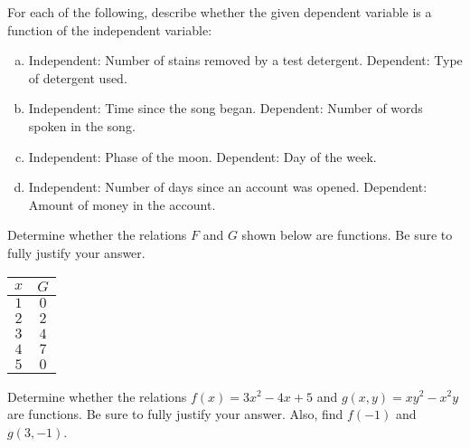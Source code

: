 \documentclass[11pt,letterpaper]{article}
\begin{document}

 For each of the following, describe whether the given dependent variable is a function of the independent variable:
	\begin{enumerate}[(a)]
	\item Independent: Number of stains removed by a test detergent. 
		Dependent: Type of detergent used. 
	\item Independent: Time since the song began.
		Dependent: Number of words spoken in the song. 
	\item Independent: Phase of the moon.
		Dependent: Day of the week. 
	\item Independent: Number of days since an account was opened. 
		Dependent: Amount of money in the account. 
	\end{enumerate}



\newpage



 Determine whether the relations $F$ and $G$ shown below are functions. Be sure to fully justify your answer. \pspace
	\hfill
	\begin{minipage}[c]{0.48\textwidth}
	\end{minipage}%
	\begin{minipage}[c]{0.40\textwidth}
	\begin{table}[H]
	\centering
	\begin{tabular}{cc}
	$x$ & $G$ \\ \hline
	$1$ & $0$ \\
	$2$ & $2$ \\
	$3$ & $4$ \\
	$4$ & $7$ \\
	$5$ & $0$
	\end{tabular}
	\end{table}
	\end{minipage} \pspace



\newpage



 Determine whether the relations $f(x)= 3x^2 - 4x + 5$ and $g(x, y)= xy^2 - x^2y$ are functions. Be sure to fully justify your answer. Also, find $f(-1)$ and $g(3, -1)$. 
\end{document}
